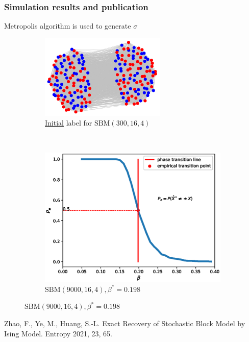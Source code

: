 \documentclass[notheorems]{beamer}
\begin{document}
	\begin{frame}
	\frametitle{Simulation results and publication}
	Metropolis algorithm is used to generate $\sigma$
	
	\begin{figure}
		\centering
		\begin{subfigure}{0.45\textwidth}
			\includegraphics[width=\textwidth]{000.png}
			\caption{\href{run:./demo.mp4}{Initial} label for $\textrm{SBM}(300, 16, 4)$}
		\end{subfigure}~
		\begin{subfigure}{0.53\textwidth}
			\includegraphics[width=\textwidth]{beta_trans-2020-11-28.eps}
			\caption{$\textrm{SBM}(9000, 16, 4), \beta^*=0.198$}
		\end{subfigure}
	\end{figure}
	Zhao, F., Ye, M., Huang, S.-L. Exact Recovery of Stochastic Block Model by Ising Model. Entropy 2021, 23, 65.
	
\end{frame}
	
\end{document}
